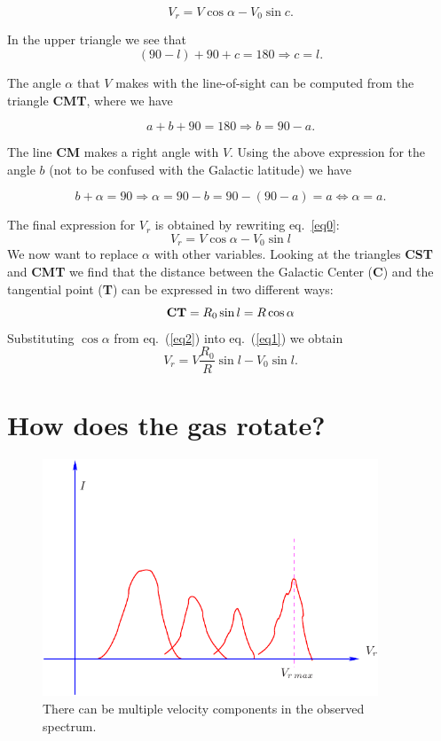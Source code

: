 \begin{equation}
V_r = V \cos\alpha - V_0 \sin c .
\label{eq0}
\end{equation}

In the upper triangle we see that 
$$(90-l)+90+c=180 \Rightarrow \boxed{c=l.}$$

The angle
$\alpha$ that $V$ makes with the line-of-sight can be computed from
the triangle {\bf CMT}, where we have

$$a+b+90=180 \Rightarrow b=90-a.$$

The line {\bf CM} makes a right angle with $V$. Using the above expression
for the angle $b$ (not to be confused with the Galactic latitude) we have

$$b+\alpha=90 \Rightarrow \alpha=90-b=90-(90-a)=a \Leftrightarrow \boxed{\alpha=a.}$$


The final expression for $V_r$ is obtained by rewriting eq.~\ref{eq0}:
\begin{equation}
V_r = V \cos\alpha - V_0 \sin l
\label{eq1}
\end{equation}
We now want to replace $\alpha$ with other variables. Looking at the
triangles {\bf CST} and {\bf CMT} we find that the distance between the
Galactic Center ({\bf C}) and the tangential point ({\bf T}) can be expressed in
two different ways: 
\begin{equation}
{\rm\bf CT} = R_0\sin l = R \cos\alpha
\label{eq2}
\end{equation}
Substituting $\cos \alpha$ from eq.~(\ref{eq2}) into eq.~(\ref{eq1}) we
obtain
\begin{equation}
\boxed{V_r = V \frac{R_0}{R}\sin l - V_0 \sin l .}
\label{eq3}
\end{equation}


\section{How does the gas rotate?}\label{sect-rotation}

\begin{figure}[ht]
\begin{center}
\includegraphics[width=10cm]{../figures/vmax.pdf}
\end{center}
\caption{There can be multiple velocity components in the observed spectrum.}
\label{figvmax}
\end{figure}


